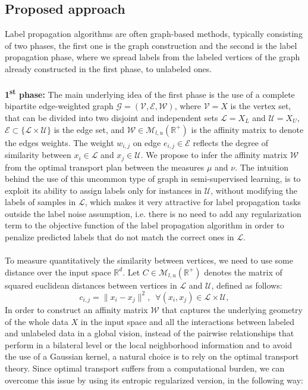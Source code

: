 \documentclass[conference]{IEEEtran}
\begin{document}
\subsection{Proposed approach}
Label propagation algorithms are often  graph-based methods, typically consisting of two phases, the first one is the graph construction and the second is the label propagation phase, where we spread labels from the labeled vertices of the graph already constructed in the first phase, to unlabeled ones.
\\
\\ 
\textbf{1\textsuperscript{st} phase:} The main underlying idea of the first phase is the use of a complete bipartite edge-weighted graph \cite{asratian1998bipartite}  $\mathcal{G}=(\mathcal{V},\mathcal{E},\mathcal{W})$, where $\mathcal{V} = X$ is the vertex set, that can be divided into two disjoint and independent sets $\mathcal{L} = X_L$ and $\mathcal{U} = X_U$, $\mathcal{E} \subset \{\mathcal{L} \times \mathcal{U}\}$ is the edge set, and $\mathcal{W} \in \mathcal{M}_{l,u}(\mathbb{R}^+)$ is the affinity matrix to denote the edges weights. The weight $w_{i,j}$ on edge $e_{i,j} \in \mathcal{E}$ reflects the degree of similarity between $x_i \in  \mathcal{L}$ and $x_j \in \mathcal{U}$. We propose to infer the affinity matrix $\mathcal{W}$ from the optimal transport plan between the measures $\mu$ and $\nu$. The intuition behind the use of this uncommon type of graph in semi-supervised learning, is to exploit its ability to assign labels only for instances in $\mathcal{U}$, without modifying the labels of samples in $\mathcal{L}$, which makes it very attractive for label propagation tasks outside the label noise assumption, i.e. there is no need to add any regularization term to the objective function of the label propagation algorithm in order to penalize predicted labels that do not match the correct ones in $\mathcal{L}$.
\\
\\ To measure quantitatively the similarity between vertices, we need to use some distance over the input space $\mathbb{R}^d$. Let $C \in \mathcal{M}_{l,u}(\mathbb{R}^+)$ denotes the matrix of squared euclidean distances between vertices in $\mathcal{L}$ and $\mathcal{U}$, defined as follows:
\begin{equation}
c_{i,j} = \lVert x_i - x_j \rVert^2,  \, \, \, \forall (x_i,x_j ) \in \mathcal{L} \times \mathcal{U},
\end{equation}
In order to construct an affinity matrix $\mathcal{W}$ that captures the underlying geometry of the whole data $X$ in the input space and all the interactions between labeled and unlabeled data in a global vision, instead of the pairwise relationships that perform in a bilateral level or the local neighborhood information and to avoid the use of a Gaussian kernel, a natural choice is to rely on the optimal transport theory. Since optimal transport suffers from a computational burden, we can overcome this issue by using its entropic regularized version, in the following way:
\end{document}
